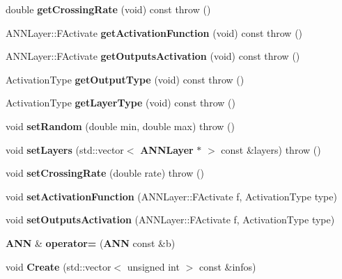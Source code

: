 \begin{DoxyCompactItemize}
\item 
double {\bfseries get\+Crossing\+Rate} (void) const   throw ()\label{class_g_a_n_n_1_1_a_n_n_a0f0cfbbfd49b831516075cd6360366ad}

\item 
A\+N\+N\+Layer\+::\+F\+Activate {\bfseries get\+Activation\+Function} (void) const   throw ()\label{class_g_a_n_n_1_1_a_n_n_ab94e7f60a43f5bef2314529075a95487}

\item 
A\+N\+N\+Layer\+::\+F\+Activate {\bfseries get\+Outputs\+Activation} (void) const   throw ()\label{class_g_a_n_n_1_1_a_n_n_a26b4cbdcbe8bd55986963b26c2e152ee}

\item 
Activation\+Type {\bfseries get\+Output\+Type} (void) const   throw ()\label{class_g_a_n_n_1_1_a_n_n_a5b018a16c817ea663979847b51759299}

\item 
Activation\+Type {\bfseries get\+Layer\+Type} (void) const   throw ()\label{class_g_a_n_n_1_1_a_n_n_abe0b24faf6c8664c66157c6de3a92774}

\item 
void {\bfseries set\+Random} (double min, double max)  throw ()\label{class_g_a_n_n_1_1_a_n_n_adcedd9edf79df8a07a25d11cdefb5310}

\item 
void {\bfseries set\+Layers} (std\+::vector$<$ {\bf A\+N\+N\+Layer} $\ast$ $>$ const \&layers)  throw ()\label{class_g_a_n_n_1_1_a_n_n_aae6cc0117e368dec728e5164fd4877cc}

\item 
void {\bfseries set\+Crossing\+Rate} (double rate)  throw ()\label{class_g_a_n_n_1_1_a_n_n_a4476dd0e4d95747cae5489db42639190}

\item 
void {\bfseries set\+Activation\+Function} (A\+N\+N\+Layer\+::\+F\+Activate f, Activation\+Type type)\label{class_g_a_n_n_1_1_a_n_n_a416cb5c5b0d916a9f2ed005494f07be6}

\item 
void {\bfseries set\+Outputs\+Activation} (A\+N\+N\+Layer\+::\+F\+Activate f, Activation\+Type type)\label{class_g_a_n_n_1_1_a_n_n_acc21816e2cb7543eb64d01d9f4a2e30a}

\item 
{\bf A\+N\+N} \& {\bfseries operator=} ({\bf A\+N\+N} const \&b)\label{class_g_a_n_n_1_1_a_n_n_a854dad61d6d8099bf1b9a8d3930a73ab}

\item 
void {\bfseries Create} (std\+::vector$<$ unsigned int $>$ const \&infos)\label{class_g_a_n_n_1_1_a_n_n_a65b8b6fd67dc3a07a40a39cc611af319}


\end{DoxyCompactItemize}
